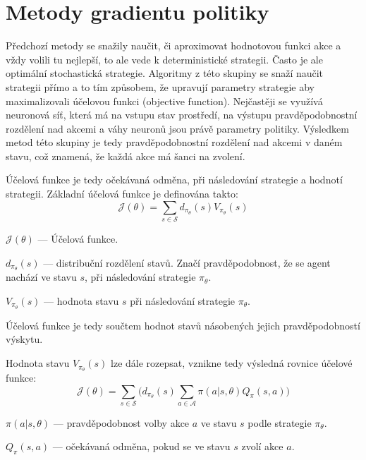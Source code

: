 \section{Metody gradientu politiky}\label{subsec:gradientni_metody}
Předchozí metody se snažily naučit, či aproximovat hodnotovou funkci akce a vždy volili tu nejlepší, to ale vede k deterministické strategii.
Často je ale optimální stochastická strategie.
Algoritmy z této skupiny se snaží naučit strategii přímo a to tím způsobem, že upravují parametry strategie aby maximalizovali účelovou funkci (objective function).
Nejčastěji se využívá neuronová síť, která má na vstupu stav prostředí, na výstupu pravděpodobnostní rozdělení nad akcemi a váhy neuronů jsou právě parametry politiky.
Výsledkem metod této skupiny je tedy pravděpodobnostní rozdělení nad akcemi v daném stavu, což znamená, že každá akce má šanci na zvolení.

Účelová funkce je tedy očekávaná odměna, při následování strategie a hodnotí strategii.
Základní účelová funkce je definována takto:
\begin{equation}
    \label{eq:ucelova_funkce_spojita}
  \mathcal{J}(\theta) = \sum_{s \in \mathcal{S}} d_{\pi_\theta}(s) V_{\pi_\theta}(s)
  \end{equation}

\begin{myitemize}
  \item $\mathcal{J}(\theta)$ --- Účelová funkce.
  \item $d_{\pi_\theta}(s)$ --- distribuční rozdělení stavů. Značí pravděpodobnost, že se agent nachází ve stavu $s$, při následování strategie $\pi_\theta$.
  \item $V_{\pi_\theta}(s)$ --- hodnota stavu $s$ při následování strategie $\pi_\theta$.\par
  \item Účelová funkce je tedy součtem hodnot stavů násobených jejich pravděpodobností výskytu.
\end{myitemize}

Hodnota stavu $V_{\pi_\theta}(s)$ lze dále rozepsat, vznikne tedy výsledná rovnice účelové funkce:
\begin{equation}
  \mathcal{J}(\theta) = \sum_{s \in \mathcal{S}} \Big( d_{\pi_\theta}(s) \sum_{a \in \mathcal{A}} \pi(a \vert s, \theta) Q_\pi(s, a) \Big)
\end{equation}

\begin{myitemize}
  \item $\pi(a \vert s, \theta)$ --- pravděpodobnost volby akce $a$ ve stavu $s$ podle strategie $\pi_\theta$.
  \item $Q_\pi(s, a)$ --- očekávaná odměna, pokud se ve stavu $s$ zvolí akce $a$.
\end{myitemize}

